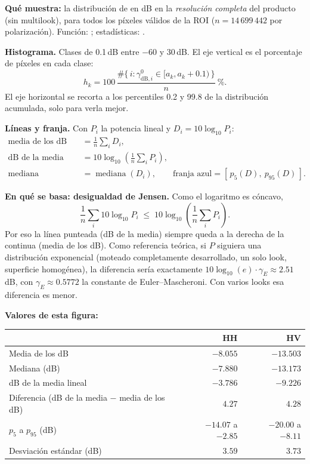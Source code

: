 \documentclass[11pt,a4paper]{article}
\begin{document}
\textbf{Qué muestra:} la distribución de \gz{} en dB en la \emph{resolución completa} del producto (sin multilook), para todos los
píxeles válidos de la ROI ($n = 14\,699\,442$ por polarización). Función: ; estadísticas: .

\textbf{Histograma.} Clases de 0.1\,dB entre $-60$ y $30$\,dB. El eje vertical es el porcentaje de píxeles en cada clase:
\begin{equation}
  h_k = 100\,\frac{\#\{\,i : \gamma^0_{\text{dB},i} \in [a_k, a_k + 0.1)\,\}}{n}\ \%.
\end{equation}
El eje horizontal se recorta a los percentiles 0.2 y 99.8 de la distribución acumulada, solo para verla mejor.

\textbf{Líneas y franja.} Con $P_i$ la potencia lineal y $D_i = 10\log_{10}P_i$:
\begin{align}
  \text{media de los dB} &= \frac{1}{n}\sum_i D_i, \\
  \text{dB de la media lineal} &= 10\log_{10}\!\left(\frac{1}{n}\sum_i P_i\right), \\
  \text{mediana} &= \operatorname{mediana}(D_i), \qquad \text{franja azul} = [\,p_5(D),\ p_{95}(D)\,].
\end{align}

\textbf{En qué se basa: desigualdad de Jensen.} Como el logaritmo es cóncavo,
\begin{equation}
  \frac{1}{n}\sum_i 10\log_{10}P_i \;\le\; 10\log_{10}\!\left(\frac{1}{n}\sum_i P_i\right).
\end{equation}
Por eso la línea punteada (dB de la media) siempre queda a la derecha de la continua (media de los dB). Como referencia teórica, si
$P$ siguiera una distribución exponencial (moteado completamente desarrollado, un solo look, superficie homogénea), la diferencia
sería exactamente $10\log_{10}(e)\cdot\gamma_E \approx 2.51$\,dB, con $\gamma_E \approx 0.5772$ la constante de Euler--Mascheroni.
Con varios looks esa diferencia es menor.

\textbf{Valores de esta figura:}

\begin{longtable}{lrr}
\toprule
 & \textbf{HH} & \textbf{HV} \\
\midrule
Media de los dB & $-8.055$ & $-13.503$ \\
Mediana (dB) & $-7.880$ & $-13.173$ \\
dB de la media lineal & $-3.786$ & $-9.226$ \\
Diferencia (dB de la media $-$ media de los dB) & $4.27$ & $4.28$ \\
$p_5$ a $p_{95}$ (dB) & $-14.07$ a $-2.85$ & $-20.00$ a $-8.11$ \\
Desviación estándar (dB) & $3.59$ & $3.73$ \\
\bottomrule
\end{longtable}
\end{document}
